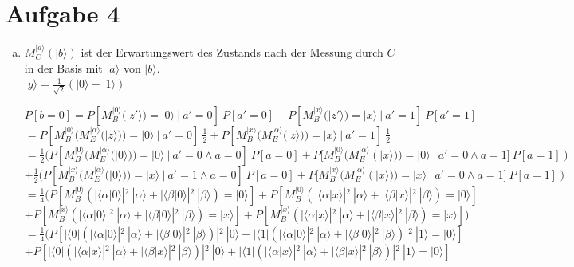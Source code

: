 \documentclass[a4paper]{scrartcl}
\begin{document}
\newpage
\section*{Aufgabe 4}
\begin{enumerate}[a)]

\item $M_C^{|a\rangle}(|b\rangle)$ ist der Erwartungswert des Zustands nach der Messung durch $C$ in der Basis mit $|a\rangle$ von $|b\rangle$.\\
$|y\rangle = \frac{1}{\sqrt{2}} (|0\rangle -|1\rangle)$

$P[b=0] = P[M_B^{|0\rangle}(|z'\rangle)=|0\rangle~|~a'=0]~P[a'=0] + P[M_B^{|x\rangle}(|z'\rangle)=|x\rangle~|~a'=1]~P[a'=1]$\\
$=P[M_B^{|0\rangle}(M_E^{|\alpha \rangle}(|z\rangle))=|0\rangle~|~a'=0]~\frac{1}{2} + P[M_B^{|x\rangle}(M_E^{|\alpha \rangle}(|z\rangle))=|x\rangle~|~a'=1]~\frac{1}{2}$\\
$=\frac{1}{2} (P[M_B^{|0\rangle}(M_E^{|\alpha \rangle}(|0\rangle))=|0\rangle~|~a'=0 \wedge a=0]~P[a=0] + P[M_B^{|0\rangle}(M_E^{|\alpha \rangle}(|x\rangle))=|0\rangle~|~a'=0 \wedge a=1]~P[a=1])$\\
$+\frac{1}{2} (P[M_B^{|x\rangle}(M_E^{|\alpha \rangle}(|0\rangle))=|x\rangle~|~a'=1 \wedge a=0]~P[a=0] + P[M_B^{|x\rangle}(M_E^{|\alpha \rangle}(|x\rangle))=|x\rangle~|~a'=0 \wedge a=1]~P[a=1])$\\
$=\frac{1}{4} (P[M_B^{|0\rangle}(|\langle \alpha|0\rangle|^2~|\alpha\rangle + |\langle \beta|0\rangle|^2~|\beta\rangle)=|0\rangle] + P[M_B^{|0\rangle}(|\langle \alpha|x\rangle|^2~|\alpha\rangle + |\langle \beta|x\rangle|^2~|\beta\rangle)=|0\rangle]$\\
$+ P[M_B^{|x\rangle}(|\langle \alpha|0\rangle|^2~|\alpha\rangle + |\langle \beta|0\rangle|^2~|\beta\rangle)=|x\rangle] + P[M_B^{|x\rangle}(|\langle \alpha|x\rangle|^2~|\alpha\rangle + |\langle \beta|x\rangle|^2~|\beta\rangle)=|x\rangle])$\\
$=\frac{1}{4} (P[|\langle 0|(|\langle \alpha|0\rangle|^2~|\alpha\rangle + |\langle \beta|0\rangle|^2~|\beta\rangle)|^2~|0\rangle + |\langle 1|(|\langle \alpha|0\rangle|^2~|\alpha\rangle + |\langle \beta|0\rangle|^2~|\beta\rangle)|^2~|1\rangle=|0\rangle]$\\
$+ P[|\langle 0|(|\langle \alpha|x\rangle|^2~|\alpha\rangle + |\langle \beta|x\rangle|^2~|\beta\rangle)|^2~|0\rangle + |\langle 1|(|\langle \alpha|x\rangle|^2~|\alpha\rangle + |\langle \beta|x\rangle|^2~|\beta\rangle)|^2~|1\rangle =|0\rangle]$\\

\end{enumerate}
\end{document}
